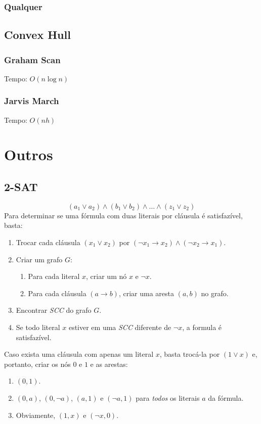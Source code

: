 \documentclass[12pt,a4paper]{article}
\begin{document}
			\subsubsection{Qualquer}
				
		\subsection{Convex Hull}
			\subsubsection{Graham Scan}
				Tempo: \(O(n \log n)\)
				
			\subsubsection{Jarvis March}
				Tempo: \(O(n h)\)
				

	\section{Outros}
		\subsection{2-SAT}
			\[ (a_1 \vee a_2) \wedge (b_1 \vee b_2) \wedge \ldots \wedge (z_1 \vee z_2) \]
			Para determinar se uma fórmula com duas literais por cláusula é satisfazível, basta:
			\begin{enumerate}
				\item Trocar cada cláusula $ (x_1 \vee x_2) $ por $ (\neg x_1 \rightarrow x_2) \wedge (\neg x_2 \rightarrow x_1) $.
				\item Criar um grafo $G$:
				\begin{enumerate}
					\item Para cada literal $x$, criar um nó $x$ e $\neg x$.
					\item Para cada cláusula $ (a \rightarrow b) $, criar uma aresta $(a, b)$ no grafo.
				\end{enumerate}
				\item Encontrar \emph{SCC} do grafo $G$.
				\item Se todo literal $x$ estiver em uma \emph{SCC} diferente de $\neg x$, a formula é satisfazível.
			\end{enumerate}
			Caso exista uma cláusula com apenas um literal $x$, basta trocá-la por $(1 \vee x)$ e, portanto, criar os nós $0$ e $1$ e as arestas:
			\begin{enumerate}
				\item $(0, 1)$.
				\item $(0, a)$, $(0, \neg a)$, $(a, 1)$ e $(\neg a, 1)$ para \emph{todos} os literais $a$ da fórmula.
				\item Obviamente, $(1, x)$ e $(\neg x, 0)$.
			\end{enumerate}
\end{document}
